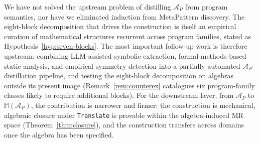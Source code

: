 \documentclass[acmsmall, screen]{acmart}
\begin{document}
We have not solved the upstream problem of distilling $\mathcal{A}_P$ from program semantics, nor have we eliminated induction from MetaPattern discovery. The eight-block decomposition that drives the construction is itself an empirical curation of mathematical structures recurrent across program families, stated as Hypothesis~\ref{hyp:seven-blocks}. The most important follow-up work is therefore upstream: combining LLM-assisted symbolic extraction, formal-methods-based static analysis, and empirical-symmetry detection into a partially automated $\mathcal{A}_P$-distillation pipeline, and testing the eight-block decomposition on algebras outside its present image (Remark~\ref{rem:counterex} catalogues six program-family classes likely to require additional blocks). For the downstream layer, from $\mathcal{A}_P$ to $\mathbb{M}(\mathcal{A}_P)$, the contribution is narrower and firmer: the construction is mechanical, algebraic closure under \texttt{Translate} is provable within the algebra-induced MR space (Theorem~\ref{thm:closure}), and the construction transfers across domains once the algebra has been specified.
\end{document}
